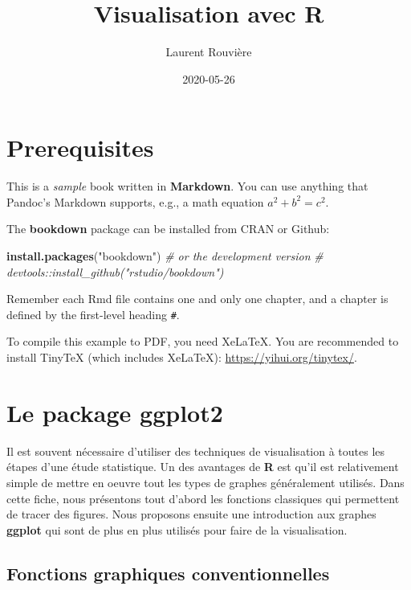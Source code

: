 \documentclass[]{book}
\title{Visualisation avec R}
\author{Laurent Rouvière}
\date{2020-05-26}
\newenvironment{Shaded}{\begin{snugshade}}{\end{snugshade}}
\newcommand{\CommentTok}[1]{\textcolor[rgb]{0.56,0.35,0.01}{\textit{#1}}}
\newcommand{\KeywordTok}[1]{\textcolor[rgb]{0.13,0.29,0.53}{\textbf{#1}}}
\newcommand{\NormalTok}[1]{#1}
\newcommand{\StringTok}[1]{\textcolor[rgb]{0.31,0.60,0.02}{#1}}
\theoremstyle{definition}
\theoremstyle{definition}
\theoremstyle{definition}
\theoremstyle{remark}
\begin{document}
\maketitle

{
\setcounter{tocdepth}{1}
\tableofcontents
}
\hypertarget{prerequisites}{%
\chapter{Prerequisites}\label{prerequisites}}

This is a \emph{sample} book written in \textbf{Markdown}. You can use anything that Pandoc's Markdown supports, e.g., a math equation \(a^2 + b^2 = c^2\).

The \textbf{bookdown} package can be installed from CRAN or Github:

\begin{Shaded}
\begin{Highlighting}[]
\KeywordTok{install.packages}\NormalTok{(}\StringTok{"bookdown"}\NormalTok{)}
\CommentTok{# or the development version}
\CommentTok{# devtools::install_github("rstudio/bookdown")}
\end{Highlighting}
\end{Shaded}

Remember each Rmd file contains one and only one chapter, and a chapter is defined by the first-level heading \texttt{\#}.

To compile this example to PDF, you need XeLaTeX. You are recommended to install TinyTeX (which includes XeLaTeX): \url{https://yihui.org/tinytex/}.

\hypertarget{ggplot2}{%
\chapter{Le package ggplot2}\label{ggplot2}}

Il est souvent nécessaire d'utiliser des techniques de visualisation à toutes les étapes d'une étude statistique. Un des avantages de \textbf{R} est qu'il est relativement simple de mettre en oeuvre tout les types de graphes généralement utilisés. Dans cette fiche, nous présentons tout d'abord les fonctions classiques qui permettent de tracer des figures. Nous proposons ensuite une introduction aux graphes \textbf{ggplot} qui sont de plus en plus utilisés pour faire de la visualisation.

\hypertarget{fonctions-graphiques-conventionnelles}{%
\section{Fonctions graphiques conventionnelles}\label{fonctions-graphiques-conventionnelles}}
\end{document}
